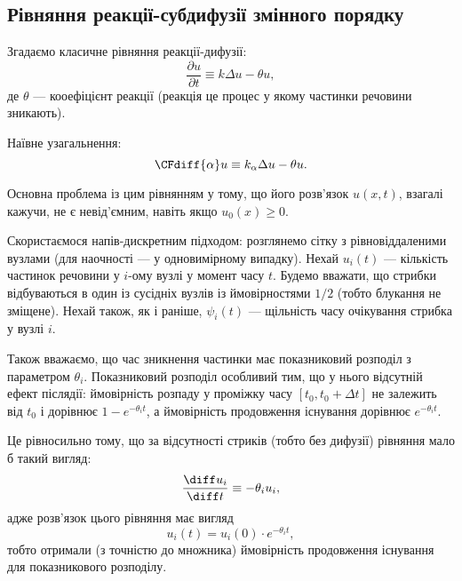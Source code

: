 \subsection{Рівняння реакції-субдифузії змінного порядку}

Згадаємо класичне рівняння реакції-дифузії:
\begin{equation}
    \frac{\partial u}{\partial t} \equiv k \Delta u - \theta u,
\end{equation}
де $\theta$ --- кооефіцієнт реакції (реакція це процес у якому частинки речовини зникають). \medskip

Наївне узагальнення:
\begin{equation}
    \CFdiff{\alpha} u \equiv k_\alpha \Delta u - \theta u.
\end{equation}

\begin{remark}
    Основна проблема із цим рівнянням у тому, що його розв'язок $u(x, t)$, взагалі кажучи, не є невід'ємним, навіть якщо $u_0(x) \ge 0$.
\end{remark}

Скористаємося напів-дискретним підходом: розглянемо сітку з рівновіддаленими вузлами (для наочності --- у одновимірному випадку). Нехай $u_i(t)$ --- кількість частинок речовини у $i$-ому вузлі у момент часу $t$. Будемо вважати, що стрибки відбуваються в один із сусідніх вузлів із ймовірностями $1/2$ (тобто блукання не зміщене). Нехай також, як і раніше, $\psi_i(t)$ --- щільність часу очікування стрибка у вузлі $i$. \medskip

Також вважаємо, що час зникнення частинки має показниковий розподіл з параметром $\theta_i$. Показниковий розподіл особливий тим, що у нього відсутній ефект післядії: ймовірність розпаду у проміжку часу $[t_0, t_0 + \Delta t]$ не залежить від $t_0$ і дорівнює $1 - e^{-\theta_i t}$, а ймовірність продовження існування дорівнює $e^{-\theta_i t}$. \medskip

Це рівносильно тому, що за відсутності стриків (тобто без дифузії) рівняння мало б такий вигляд:
\begin{equation}
    \frac{\diff u_i}{\diff t} \equiv -\theta_i u_i,
\end{equation}
адже розв'язок цього рівняння має вигляд
\begin{equation}
    u_i(t) = u_i(0) \cdot e^{-\theta_i t},
\end{equation}
тобто отримали (з точністю до множника) ймовірність продовження існування для показникового розподілу. \medskip

